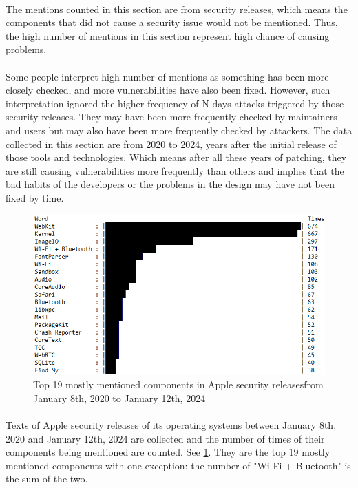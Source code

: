\documentclass[mscthesis]{usiinfthesis}
\begin{document}
\paragraph{}
The mentions counted in this section are from security releases, which means the components that did not cause a security issue would not be mentioned. Thus, the high number of mentions in this section represent high chance of causing problems.
\paragraph{}
Some people interpret high number of mentions as something has been more closely checked, and more vulnerabilities have also been fixed. However, such interpretation ignored the higher frequency of N-days attacks triggered by those security releases. They may have been more frequently checked by maintainers and users but may also have been more frequently checked by attackers. The data collected in this section are from 2020 to 2024, years after the initial release of those tools and technologies. Which means after all these years of patching, they are still causing vulnerabilities more frequently than others and implies that the bad habits of the developers or the problems in the design may have not been fixed by time.
\begin{figure}[H]
  \includegraphics[width=\textwidth]{data/apple_security_releases/result.png}
  \caption{Top 19 mostly mentioned components in Apple security releases\newline from January 8th, 2020 to January 12th, 2024}
  \label{fig:apple-sec-release}
\end{figure}
\paragraph{}
Texts of Apple security releases of its operating systems between January 8th, 2020 and January 12th, 2024 are collected and the number of times of their components being mentioned are counted. See \cref{fig:apple-sec-release}. They are the top 19 mostly mentioned components with one exception: the number of "Wi-Fi + Bluetooth" is the sum of the two. 
\end{document}
